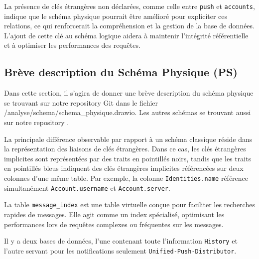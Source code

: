 \documentclass[a4paper,11pt]{article}
\begin{document}


La présence de clés étrangères non déclarées, comme celle entre \texttt{push} et \texttt{accounts}, indique que le schéma physique pourrait être amélioré pour expliciter ces relations, ce qui renforcerait la compréhension et la gestion de la base de données. L'ajout de cette clé au schéma logique aidera à maintenir l'intégrité référentielle et à optimiser les performances des requêtes.

\subsection*{Brève description du Schéma Physique (PS)}

Dans cette section, il s'agira de donner une brève description du schéma physique se trouvant sur notre repository Git dans le fichier /analyse/schema/schema\_physique.drawio. Les autres schémas se trouvant aussi  sur notre repository .

La principale différence observable par rapport à un schéma classique réside dans la représentation des liaisons de clés étrangères. Dans ce cas, les clés étrangères implicites sont représentées par des traits en pointillés noirs, tandis que les traits en pointillés bleus indiquent des clés étrangères implicites référencées sur deux colonnes d'une même table. Par exemple, la colonne \texttt{Identities.name} référence simultanément \texttt{Account.username} et \texttt{Account.server}.

La table \texttt{message\_index} est une table virtuelle conçue pour faciliter les recherches rapides de messages. Elle agit comme un index spécialisé, optimisant les performances lors de requêtes complexes ou fréquentes sur les messages.

Il y a deux bases de données, l'une contenant toute l'information \texttt{History} et l'autre servant pour les notifications seulement \texttt{Unified-Push-Distributor}.
\end{document}

